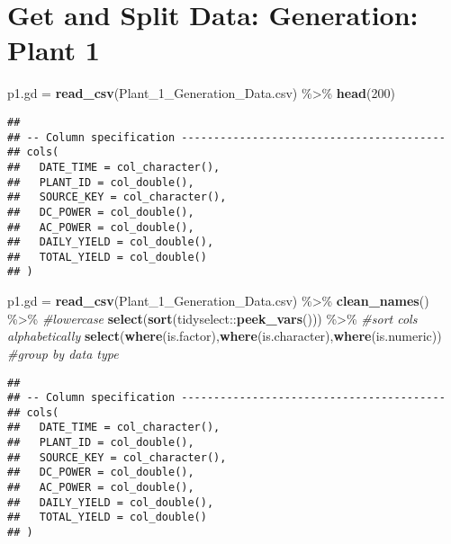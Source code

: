\documentclass[]{tufte-handout}
\newenvironment{Shaded}{}{}
\newcommand{\CommentTok}[1]{\textcolor[rgb]{0.38,0.63,0.69}{\textit{#1}}}
\newcommand{\DecValTok}[1]{\textcolor[rgb]{0.25,0.63,0.44}{#1}}
\newcommand{\KeywordTok}[1]{\textcolor[rgb]{0.00,0.44,0.13}{\textbf{#1}}}
\newcommand{\NormalTok}[1]{#1}
\newcommand{\OperatorTok}[1]{\textcolor[rgb]{0.40,0.40,0.40}{#1}}
\newcommand{\StringTok}[1]{\textcolor[rgb]{0.25,0.44,0.63}{#1}}
\begin{document}
\hypertarget{get-and-split-data-generation-plant-1}{%
\section{Get and Split Data: Generation: Plant
1}\label{get-and-split-data-generation-plant-1}}

\begin{Shaded}
\begin{Highlighting}[]
\NormalTok{p1.gd =}\StringTok{ }\KeywordTok{read\_csv}\NormalTok{(}\StringTok{\textquotesingle{}Plant\_1\_Generation\_Data.csv\textquotesingle{}}\NormalTok{) }\OperatorTok{\%\textgreater{}\%}\StringTok{ }\KeywordTok{head}\NormalTok{(}\DecValTok{200}\NormalTok{)}
\end{Highlighting}
\end{Shaded}

\begin{verbatim}
## 
## -- Column specification -----------------------------------------
## cols(
##   DATE_TIME = col_character(),
##   PLANT_ID = col_double(),
##   SOURCE_KEY = col_character(),
##   DC_POWER = col_double(),
##   AC_POWER = col_double(),
##   DAILY_YIELD = col_double(),
##   TOTAL_YIELD = col_double()
## )
\end{verbatim}

\begin{Shaded}
\begin{Highlighting}[]
\NormalTok{p1.gd =}\StringTok{ }\KeywordTok{read\_csv}\NormalTok{(}\StringTok{\textquotesingle{}Plant\_1\_Generation\_Data.csv\textquotesingle{}}\NormalTok{) }\OperatorTok{\%\textgreater{}\%}\StringTok{ }
\StringTok{  }\KeywordTok{clean\_names}\NormalTok{() }\OperatorTok{\%\textgreater{}\%}\StringTok{  }\CommentTok{\#lowercase}
\StringTok{  }\KeywordTok{select}\NormalTok{(}\KeywordTok{sort}\NormalTok{(tidyselect}\OperatorTok{::}\KeywordTok{peek\_vars}\NormalTok{())) }\OperatorTok{\%\textgreater{}\%}\StringTok{ }\CommentTok{\#sort cols alphabetically}
\StringTok{  }\KeywordTok{select}\NormalTok{(}\KeywordTok{where}\NormalTok{(is.factor),}\KeywordTok{where}\NormalTok{(is.character),}\KeywordTok{where}\NormalTok{(is.numeric)) }\CommentTok{\#group by data type}
\end{Highlighting}
\end{Shaded}

\begin{verbatim}
## 
## -- Column specification -----------------------------------------
## cols(
##   DATE_TIME = col_character(),
##   PLANT_ID = col_double(),
##   SOURCE_KEY = col_character(),
##   DC_POWER = col_double(),
##   AC_POWER = col_double(),
##   DAILY_YIELD = col_double(),
##   TOTAL_YIELD = col_double()
## )
\end{verbatim}
\end{document}
